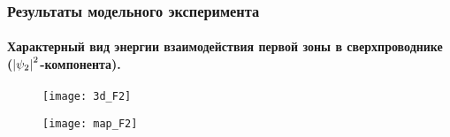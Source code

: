 \begin{frame}
    \frametitle{Результаты модельного эксперимента}
    \framesubtitle{Характерный вид энергии взаимодействия первой зоны в 
        сверхпроводнике (\( \left| \psi_2 \right|^2 \)-компонента).}
    \begin{figure}[h]
        \begin{minipage}[h]{0.49\linewidth}
            \center\texttt{[image: 3d\_F2]}
        \end{minipage}
        \hfill
        \begin{minipage}[h]{0.49\linewidth}
            \center\texttt{[image: map\_F2]}
        \end{minipage}
    \end{figure}
\end{frame}